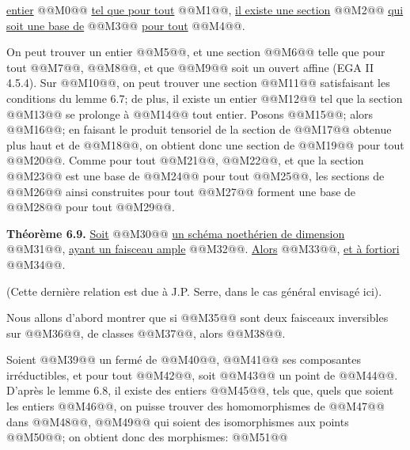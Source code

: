 
\uline{entier} @@M0@@ \uline{tel que pour tout} @@M1@@, \uline{il existe une section} @@M2@@ \uline{qui soit une base de} @@M3@@ \uline{pour tout} @@M4@@.

On peut trouver un entier @@M5@@, et une section @@M6@@ telle que pour tout @@M7@@, @@M8@@, et que @@M9@@ soit un ouvert affine (EGA II 4.5.4). Sur @@M10@@, on peut trouver une section @@M11@@ satisfaisant les conditions du lemme 6.7; de plus, il existe un entier @@M12@@ tel que la section @@M13@@ se prolonge à @@M14@@ tout entier. Posons @@M15@@; alors @@M16@@; en faisant le produit tensoriel de la section de @@M17@@ obtenue plus haut et de @@M18@@, on obtient donc une section de @@M19@@ pour tout @@M20@@. Comme pour tout @@M21@@, @@M22@@, et que la section @@M23@@ est une base de @@M24@@ pour tout @@M25@@, les sections de @@M26@@ ainsi construites pour tout @@M27@@ forment une base de @@M28@@ pour tout @@M29@@.

\textbf{Théorème 6.9.} \uline{Soit} @@M30@@ \uline{un schéma noethérien de dimension} @@M31@@, \uline{ayant un faisceau ample} @@M32@@. \uline{Alors} @@M33@@, \uline{et à fortiori} @@M34@@.

(Cette dernière relation est due à J.P. Serre, dans le cas général envisagé ici).

Nous allons d'abord montrer que si @@M35@@ sont deux faisceaux inversibles sur @@M36@@, de classes @@M37@@, alors @@M38@@.

Soient @@M39@@ un fermé de @@M40@@, @@M41@@ ses composantes irréductibles, et pour tout @@M42@@, soit @@M43@@ un point de @@M44@@. D'après le lemme 6.8, il existe des entiers @@M45@@, tels que, quels que soient les entiers @@M46@@, on puisse trouver des homomorphismes de @@M47@@ dans @@M48@@, @@M49@@ qui soient des isomorphismes aux points @@M50@@; on obtient donc des morphismes:
@@M51@@
